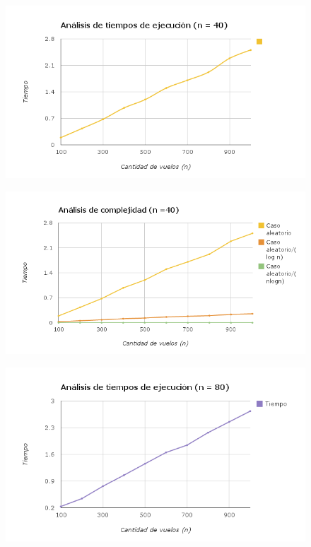 \documentclass[10pt,a4paper]{article}
\begin{document}
	\begin{figure}[h]
		\begin{center}
		    \includegraphics[scale=0.75]{graficos/tiempo_ejecucion40.png}
		\end{center}
	\end{figure}

\newpage


	\begin{figure}[h]
		\begin{center}
		   \includegraphics[scale=0.75]{graficos/complejidad_40.png}
		\end{center}
	\end{figure}


	\begin{figure}[h]
		\begin{center}
		   \includegraphics[scale=0.75]{graficos/tiempos_80.png}

		\end{center}
	\end{figure}
\end{document}
